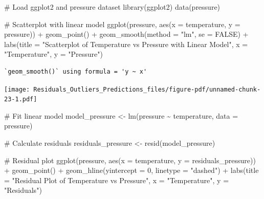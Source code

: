 \documentclass[
  letterpaper,
  DIV=11,
  numbers=noendperiod]{scrreprt}
\newenvironment{Shaded}{\begin{snugshade}}{\end{snugshade}}
\newcommand{\AttributeTok}[1]{\textcolor[rgb]{0.40,0.45,0.13}{#1}}
\newcommand{\CommentTok}[1]{\textcolor[rgb]{0.37,0.37,0.37}{#1}}
\newcommand{\ConstantTok}[1]{\textcolor[rgb]{0.56,0.35,0.01}{#1}}
\newcommand{\DecValTok}[1]{\textcolor[rgb]{0.68,0.00,0.00}{#1}}
\newcommand{\FunctionTok}[1]{\textcolor[rgb]{0.28,0.35,0.67}{#1}}
\newcommand{\NormalTok}[1]{\textcolor[rgb]{0.00,0.23,0.31}{#1}}
\newcommand{\OtherTok}[1]{\textcolor[rgb]{0.00,0.23,0.31}{#1}}
\newcommand{\SpecialCharTok}[1]{\textcolor[rgb]{0.37,0.37,0.37}{#1}}
\newcommand{\StringTok}[1]{\textcolor[rgb]{0.13,0.47,0.30}{#1}}
\begin{document}
\begin{Shaded}
\begin{Highlighting}[]
\CommentTok{\# Load ggplot2 and pressure dataset}
\FunctionTok{library}\NormalTok{(ggplot2)}
\FunctionTok{data}\NormalTok{(pressure)}

\CommentTok{\# Scatterplot with linear model}
\FunctionTok{ggplot}\NormalTok{(pressure, }\FunctionTok{aes}\NormalTok{(}\AttributeTok{x =}\NormalTok{ temperature, }\AttributeTok{y =}\NormalTok{ pressure)) }\SpecialCharTok{+}
  \FunctionTok{geom\_point}\NormalTok{() }\SpecialCharTok{+}
  \FunctionTok{geom\_smooth}\NormalTok{(}\AttributeTok{method =} \StringTok{"lm"}\NormalTok{, }\AttributeTok{se =} \ConstantTok{FALSE}\NormalTok{) }\SpecialCharTok{+}
  \FunctionTok{labs}\NormalTok{(}\AttributeTok{title =} \StringTok{"Scatterplot of Temperature vs Pressure with Linear Model"}\NormalTok{, }\AttributeTok{x =} \StringTok{"Temperature"}\NormalTok{, }\AttributeTok{y =} \StringTok{"Pressure"}\NormalTok{)}
\end{Highlighting}
\end{Shaded}

\begin{verbatim}
`geom_smooth()` using formula = 'y ~ x'
\end{verbatim}

\texttt{[image: Residuals\_Outliers\_Predictions\_files/figure-pdf/unnamed-chunk-23-1.pdf]}

\begin{Shaded}
\begin{Highlighting}[]
\CommentTok{\# Fit linear model}
\NormalTok{model\_pressure }\OtherTok{\textless{}{-}} \FunctionTok{lm}\NormalTok{(pressure }\SpecialCharTok{\textasciitilde{}}\NormalTok{ temperature, }\AttributeTok{data =}\NormalTok{ pressure)}

\CommentTok{\# Calculate residuals}
\NormalTok{residuals\_pressure }\OtherTok{\textless{}{-}} \FunctionTok{resid}\NormalTok{(model\_pressure)}

\CommentTok{\# Residual plot}
\FunctionTok{ggplot}\NormalTok{(pressure, }\FunctionTok{aes}\NormalTok{(}\AttributeTok{x =}\NormalTok{ temperature, }\AttributeTok{y =}\NormalTok{ residuals\_pressure)) }\SpecialCharTok{+}
  \FunctionTok{geom\_point}\NormalTok{() }\SpecialCharTok{+}
  \FunctionTok{geom\_hline}\NormalTok{(}\AttributeTok{yintercept =} \DecValTok{0}\NormalTok{, }\AttributeTok{linetype =} \StringTok{"dashed"}\NormalTok{) }\SpecialCharTok{+}
  \FunctionTok{labs}\NormalTok{(}\AttributeTok{title =} \StringTok{"Residual Plot of Temperature vs Pressure"}\NormalTok{, }\AttributeTok{x =} \StringTok{"Temperature"}\NormalTok{, }\AttributeTok{y =} \StringTok{"Residuals"}\NormalTok{)}
\end{Highlighting}
\end{Shaded}
\end{document}

